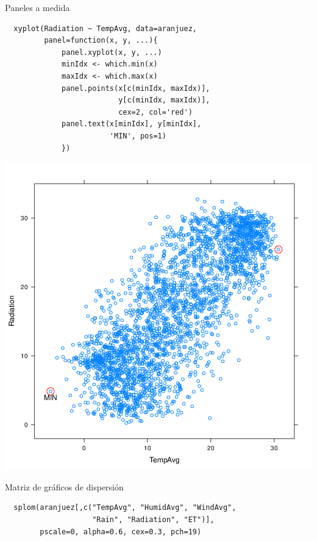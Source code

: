 \documentclass[xcolor={usenames,svgnames,dvipsnames}]{beamer}
\begin{document}
\begin{frame}[fragile,label={sec:orgheadline35}]{Paneles a medida}
 \lstset{language=R,label= ,caption= ,captionpos=b,numbers=none}
\begin{lstlisting}
  xyplot(Radiation ~ TempAvg, data=aranjuez,
         panel=function(x, y, ...){
             panel.xyplot(x, y, ...)
             minIdx <- which.min(x)
             maxIdx <- which.max(x)
             panel.points(x[c(minIdx, maxIdx)],
                          y[c(minIdx, maxIdx)],
                          cex=2, col='red')
             panel.text(x[minIdx], y[minIdx],
                        'MIN', pos=1)
             })
\end{lstlisting}
\end{frame}

\begin{frame}[label={sec:orgheadline36}]{}
\includegraphics[width=.9\linewidth]{figs/panel.png}
\end{frame}

\begin{frame}[fragile,label={sec:orgheadline37}]{Matriz de gráficos de dispersión}
 \lstset{language=R,label= ,caption= ,captionpos=b,numbers=none}
\begin{lstlisting}
  splom(aranjuez[,c("TempAvg", "HumidAvg", "WindAvg",
                    "Rain", "Radiation", "ET")],
        pscale=0, alpha=0.6, cex=0.3, pch=19)
\end{lstlisting}
\end{frame}
\end{document}
